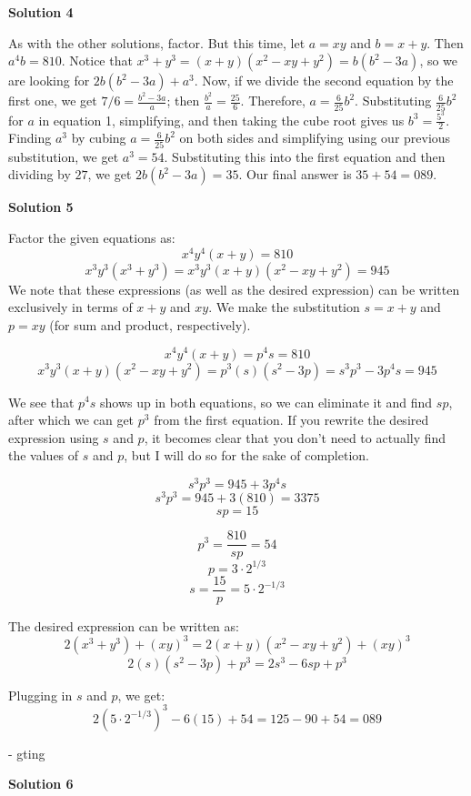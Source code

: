 \begin{enumerate}
 



\textbf{Solution 4}

As with the other solutions, factor. But this time, let $a=xy$ and $b=x+y$. Then $a^4b=810$. Notice that $x^3+y^3 = (x+y)(x^2-xy+y^2) = b(b^2-3a)$, so we are looking for $2b(b^2-3a)+a^3$. Now, if we divide the second equation by the first one, we get $7/6 = \frac{b^2-3a}{a}$; then $\frac{b^2}{a}=\frac{25}{6}$. Therefore, $a = \frac{6}{25}b^2$. Substituting $\frac{6}{25}b^2$ for $a$ in equation 1, simplifying, and then taking the cube root gives us $b^3 = \frac{5^3}{2}.$ Finding $a^3$ by cubing $a = \frac{6}{25}b^2$ on both sides and simplifying using our previous substitution, we get $a^3 = 54$. Substituting this into the first equation and then dividing by $27$, we get $2b(b^2 - 3a) = 35$. Our final answer is $35+54=\boxed{089}$.

 



\textbf{Solution 5}

Factor the given equations as:
 \[x^4y^4(x+y)=810\]
 \[x^3y^3(x^3+y^3)=x^3y^3(x+y)(x^2-xy+y^2)=945\]We note that these expressions (as well as the desired expression) can be written exclusively in terms of $x+y$ and $xy$. We make the substitution $s=x+y$ and $p=xy$ (for sum and product, respectively).

 
 \[x^4y^4(x+y)=p^4s=810\]
 \[x^3y^3(x+y)(x^2-xy+y^2)=p^3(s)(s^2-3p)=s^3p^3-3p^4s=945\]

 We see that $p^4s$ shows up in both equations, so we can eliminate it and find $sp$, after which we can get $p^3$ from the first equation. If you rewrite the desired expression using $s$ and $p$, it becomes clear that you don't need to actually find the values of $s$ and $p$, but I will do so for the sake of completion.

 
 \[s^3p^3=945+3p^4s\]
 \[s^3p^3=945+3(810)=3375\]
 \[sp=15\]

 \[p^3=\frac{810}{sp}=54\]
 \[p=3\cdot2^{1/3}\]
 \[s=\frac{15}{p}=5\cdot2^{-1/3}\]

 The desired expression can be written as:
 \[2(x^3+y^3)+(xy)^3=2(x+y)(x^2-xy+y^2)+(xy)^3\]
 \[2(s)(s^2-3p)+p^3=2s^3-6sp+p^3\]

 Plugging in $s$ and $p$, we get:
 \[2(5\cdot2^{-1/3})^3-6(15)+54=125-90+54=\boxed{089}\]

 - gting

 



\textbf{Solution 6}


\end{enumerate}

